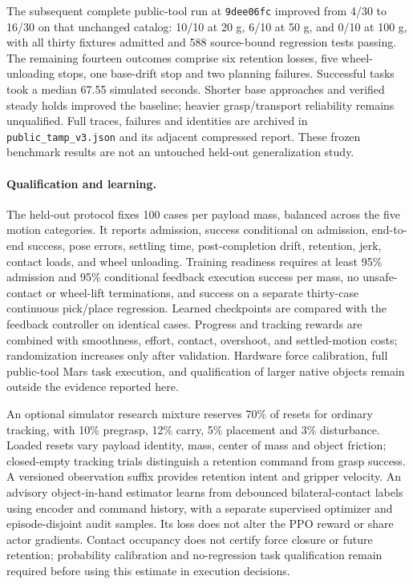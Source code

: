 The subsequent complete public-tool run at \texttt{9dee06fc} improved from 4/30
to 16/30 on that unchanged catalog: 10/10 at 20 g, 6/10 at 50 g, and 0/10 at
100 g, with all thirty fixtures admitted and 588 source-bound regression tests
passing. The remaining fourteen outcomes comprise six retention losses, five
wheel-unloading stops, one base-drift stop and two planning failures. Successful
tasks took a median 67.55 simulated seconds. Shorter base approaches and verified
steady holds improved the baseline; heavier grasp/transport reliability remains
unqualified. Full traces, failures and identities are archived in
\texttt{public\_tamp\_v3.json} and its adjacent compressed report. These frozen
benchmark results are not an untouched held-out generalization study.

\paragraph{Qualification and learning.}
The held-out protocol fixes 100 cases per payload mass, balanced across the five
motion categories. It reports admission, success conditional on admission,
end-to-end success, pose errors, settling time, post-completion drift, retention,
jerk, contact loads, and wheel unloading. Training readiness requires at least
95\% admission and 95\% conditional feedback execution success per mass, no
unsafe-contact or wheel-lift terminations, and success on a separate thirty-case
continuous pick/place regression. Learned checkpoints are compared with the
feedback controller on identical cases. Progress and tracking rewards are
combined with smoothness, effort, contact, overshoot, and settled-motion costs;
randomization increases only after validation. Hardware force calibration,
full public-tool Mars task execution, and qualification of larger native
objects remain outside the evidence reported here.

An optional simulator research mixture reserves 70\% of resets for ordinary
tracking, with 10\% pregrasp, 12\% carry, 5\% placement and 3\% disturbance.
Loaded resets vary payload identity, mass, center of mass and object friction;
closed-empty tracking trials distinguish a retention command from grasp success.
A versioned observation suffix provides retention intent and gripper velocity.
An advisory object-in-hand estimator learns from debounced bilateral-contact
labels using encoder and command history, with a separate supervised optimizer
and episode-disjoint audit samples. Its loss does not alter the PPO reward or
share actor gradients. Contact occupancy does not certify force closure or
future retention; probability calibration and no-regression task qualification
remain required before using this estimate in execution decisions.

